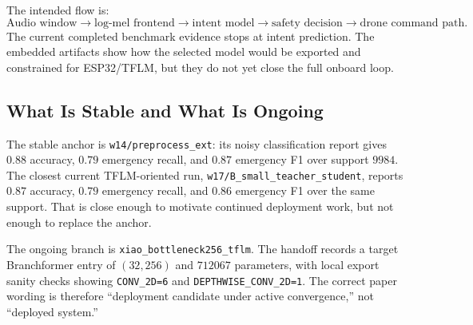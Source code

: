 The intended flow is:
\[
\text{Audio window} \rightarrow \text{log-mel frontend} \rightarrow \text{intent model} \rightarrow \text{safety decision} \rightarrow \text{drone command path}.
\]
The current completed benchmark evidence stops at intent prediction. The embedded artifacts show how the selected model would be exported and constrained for ESP32/TFLM, but they do not yet close the full onboard loop.

\subsection{What Is Stable and What Is Ongoing}

The stable anchor is \texttt{w14/preprocess\_ext}: its noisy classification report gives $0.88$ accuracy, $0.79$ emergency recall, and $0.87$ emergency F1 over support $9984$. The closest current TFLM-oriented run, \texttt{w17/B\_small\_teacher\_student}, reports $0.87$ accuracy, $0.79$ emergency recall, and $0.86$ emergency F1 over the same support. That is close enough to motivate continued deployment work, but not enough to replace the anchor.

The ongoing branch is \texttt{xiao\_bottleneck256\_tflm}. The handoff records a target Branchformer entry of $(32,256)$ and $712067$ parameters, with local export sanity checks showing \texttt{CONV\_2D=6} and \texttt{DEPTHWISE\_CONV\_2D=1}. The correct paper wording is therefore ``deployment candidate under active convergence,'' not ``deployed system.''
